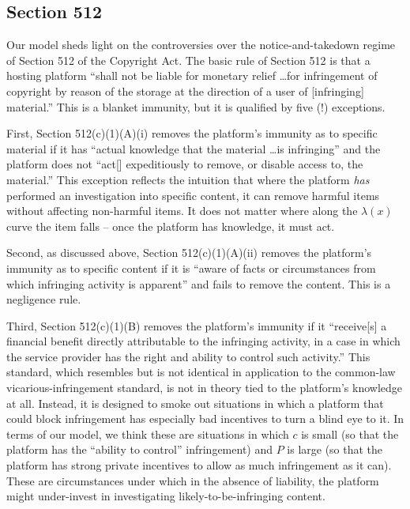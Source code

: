 % 
\subsection{Section 512}

Our model sheds light on the controversies over the notice-and-takedown regime of Section 512 of the Copyright Act. The basic rule of Section 512 is that a hosting platform ``shall not be liable for monetary relief \ldots for infringement of copyright by reason of the storage at the direction of a user of [infringing] material.'' This is a blanket immunity, but it is qualified by five (!) exceptions.

First, Section 512(c)(1)(A)(i) removes the platform's immunity as to specific material if it has ``actual knowledge that the material \ldots is infringing'' and the platform does not ``act[] expeditiously to remove, or disable access to, the material.'' This exception reflects the intuition that where the platform \emph{has} performed an investigation into specific content, it can remove harmful items without affecting non-harmful items. It does not matter where along the $\lambda(x)$ curve the item falls -- once the platform has knowledge, it must act. 

Second, as discussed above, Section 512(c)(1)(A)(ii) removes the platform's immunity as to specific content if it is ``aware of facts or circumstances from which infringing activity is apparent'' and fails to remove the content. This is a negligence rule.

Third, Section 512(c)(1)(B) removes the platform's immunity if it ``receive[s] a financial benefit directly attributable to the infringing activity, in a case in which the service provider has the right and ability to control such activity.'' This standard, which resembles but is not identical in application to the common-law vicarious-infringement standard, is not in theory tied to the platform's knowledge at all. Instead, it is designed to smoke out situations in which a platform that could block infringement has especially bad incentives to turn a blind eye to it. In terms of our model, we think these are situations in which $c$ is small (so that the platform has the ``ability to control'' infringement) and $P$ is large (so that the platform has strong private incentives to allow as much infringement as it can). These are circumstances under which in the absence of liability, the platform might under-invest in investigating likely-to-be-infringing content.

